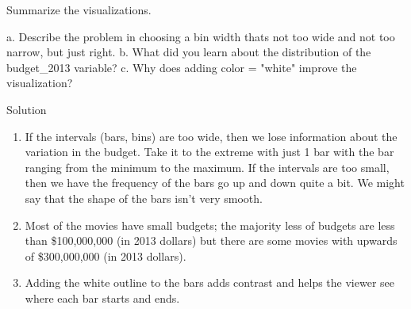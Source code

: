 \documentclass[
  letterpaper,
  DIV=11,
  numbers=noendperiod]{scrreprt}
\newenvironment{Shaded}{\begin{snugshade}}{\end{snugshade}}
\newcommand{\AttributeTok}[1]{\textcolor[rgb]{0.40,0.45,0.13}{#1}}
\newcommand{\CommentTok}[1]{\textcolor[rgb]{0.37,0.37,0.37}{#1}}
\newcommand{\DecValTok}[1]{\textcolor[rgb]{0.68,0.00,0.00}{#1}}
\newcommand{\FunctionTok}[1]{\textcolor[rgb]{0.28,0.35,0.67}{#1}}
\newcommand{\NormalTok}[1]{\textcolor[rgb]{0.00,0.23,0.31}{#1}}
\newcommand{\SpecialCharTok}[1]{\textcolor[rgb]{0.37,0.37,0.37}{#1}}
\newcommand{\StringTok}[1]{\textcolor[rgb]{0.13,0.47,0.30}{#1}}
\begin{document}
\begin{Shaded}
\end{Shaded}

\hfill\break

\begin{Shaded}
\begin{Highlighting}[]
\NormalTok{Summarize the visualizations.    }
  
\NormalTok{  a. Describe the problem in choosing a bin width that\textquotesingle{}s not too wide and not too narrow, but just right.    }
\NormalTok{  b. What did you learn about the distribution of the \textasciigrave{}budget\_2013\textasciigrave{} variable?    }
\NormalTok{  c. Why does adding \textasciigrave{}color = "white"\textasciigrave{} improve the visualization?}
\end{Highlighting}
\end{Shaded}

Solution

\begin{enumerate}
\def\labelenumi{\alph{enumi}.}
\item
  If the intervals (bars, bins) are too wide, then we lose information
  about the variation in the budget. Take it to the extreme with just 1
  bar with the bar ranging from the minimum to the maximum. If the
  intervals are too small, then we have the frequency of the bars go up
  and down quite a bit. We might say that the shape of the bars isn't
  very smooth.
\item
  Most of the movies have small budgets; the majority less of budgets
  are less than \$100,000,000 (in 2013 dollars) but there are some
  movies with upwards of \$300,000,000 (in 2013 dollars).
\item
  Adding the white outline to the bars adds contrast and helps the
  viewer see where each bar starts and ends.
\end{enumerate}

\hfill\break
\end{document}
